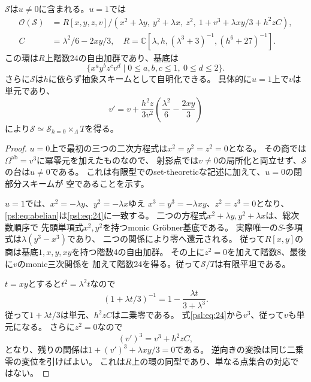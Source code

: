 \begin{lemma}\label{psl:lem:free}
$\mathcal S$は$u\ne0$に含まれる。$u=1$では
\begin{equation}
 \begin{split}
 \mathcal O(\mathcal S)
 &=R[x,y,z,v]/(x^2+\lambda y,\ y^2+\lambda x,\ z^2,\
                 1+v^3+\lambda xy/3+h^2zC),\\
 C&=\lambda^2/6-2xy/3,
 \quad R=\mathbb C[\lambda,h,(\lambda^3+3)^{-1},(h^6+27)^{-1}].
 \end{split}
 \tag{PL3}\label{psl:eq:24}
\end{equation}
この環は$R$上階数24の自由加群であり、基底は
\[
 \{x^ay^bz^cv^d\mid 0\le a,b,c\le1,\ 0\le d\le2\}.
 \tag{PL4}\label{psl:eq:basis}
\]
さらに$\mathcal S$は$h$に依らず抽象スキームとして自明化できる。
具体的に$u=1$上で$v$は単元であり、
\begin{equation}
 v'=v+\frac{h^2z}{3v^2}\left(\frac{\lambda^2}{6}-\frac{2xy}{3}\right)
 \tag{PL5}\label{psl:eq:shear}
\end{equation}
により$\mathcal S\simeq\mathcal S_{h=0}\times_\Lambda T$を得る。
\end{lemma}
\begin{proof}
$u=0$上で最初の三つの二次方程式は$x^2=y^2=z^2=0$となる。
その商では$\Omega^{\mathrm{ab}}=v^3$に冪零元を加えたものなので、
射影点では$v\ne0$の局所化と両立せず、$\mathcal S$の台は$u\ne0$である。
これは有限型でのset-theoreticな記述に加えて、$u=0$の閉部分スキームが
空であることを示す。

$u=1$では、$x^2=-\lambda y$、$y^2=-\lambda x$ゆえ
$x^3=y^3=-\lambda xy$、$z^2=z^3=0$となり、
\eqref{psl:eq:abelian}は\eqref{psl:eq:24}に一致する。
二つの方程式$x^2+\lambda y,y^2+\lambda x$は、総次数順序で
先頭単項式$x^2,y^2$を持つmonic Gr\"obner基底である。
実際唯一の$S$-多項式は$\lambda(y^3-x^3)$であり、
二つの関係により零へ還元される。
従って$R[x,y]$の商は基底$1,x,y,xy$を持つ階数4の自由加群。
その上に$z^2=0$を加えて階数8、最後に$v$のmonic三次関係を
加えて階数24を得る。従って$\mathcal S/T$は有限平坦である。

$t=xy$とすると$t^2=\lambda^2t$なので
\[
 (1+\lambda t/3)^{-1}=1-\frac{\lambda t}{3+\lambda^3}.
\]
従って$1+\lambda t/3$は単元、$h^2zC$は二乗零である。
式\eqref{psl:eq:24}から$v^3$、従って$v$も単元になる。
さらに$z^2=0$なので
\[
 (v')^3=v^3+h^2zC,
\]
となり、残りの関係は$1+(v')^3+\lambda xy/3=0$である。
逆向きの変換は同じ二乗零の変位を引けばよい。
これは$R$上の環の同型であり、単なる点集合の対応ではない。
\end{proof}

